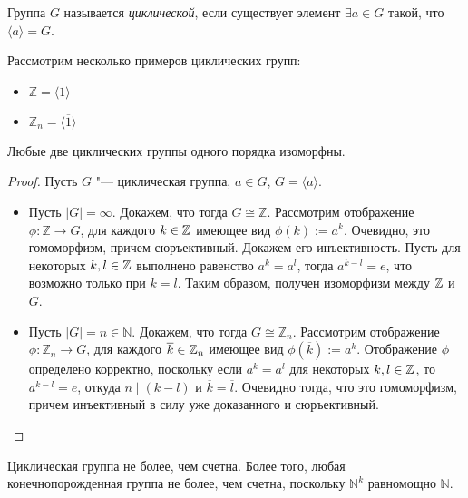 \begin{definition}
	Группа $G$ называется \textit{циклической}, если существует элемент $\exists a \in G$ такой, что $\langle a\rangle = G$.
\end{definition}

\begin{example}
	Рассмотрим несколько примеров циклических групп:
	\begin{itemize}
		\item $\mathbb{Z} = \langle 1 \rangle$
		\item $\mathbb{Z}_n = \langle \overline{1} \rangle$
	\end{itemize}
\end{example}

\begin{theorem}
	Любые две циклических группы одного порядка изоморфны.
\end{theorem}

\begin{proof}
	Пусть $G$ "--- циклическая группа, $a \in G$, $G = \langle a\rangle$.
	
	\begin{itemize}
		\item Пусть $|G| = \infty$. Докажем, что тогда $G \cong \mathbb{Z}$. Рассмотрим отображение $\phi: \mathbb{Z} \rightarrow G$, для каждого $k \in \mathbb{Z}$ имеющее вид $\phi(k) := a^k$. Очевидно, это гомоморфизм, причем сюръективный. Докажем его инъективность. Пусть для некоторых $k, l \in \mathbb{Z}$ выполнено равенство $a^k = a^l$, тогда $a^{k - l} = e$, что возможно только при $k = l$. Таким образом, получен изоморфизм между $\mathbb{Z}$ и $G$.
		
		\item Пусть $|G| = n \in \mathbb{N}$. Докажем, что тогда $G \cong \mathbb{Z}_n$. Рассмотрим отображение $\phi: \mathbb{Z}_n \rightarrow G$, для каждого $\overline{k} \in \mathbb{Z}_n$ имеющее вид $\phi(\overline{k}) := a^k$. Отображение $\phi$ определено корректно, поскольку если $a^k = a^l$ для некоторых $k, l \in \mathbb{Z}$, то $a^{k - l} = e$, откуда $n \mid (k - l)$ и $\overline{k} = \overline{l}$. Очевидно тогда, что это гомоморфизм, причем инъективный в силу уже доказанного и сюръективный.\qedhere
	\end{itemize}
\end{proof}

\begin{note}
	Циклическая группа не более, чем счетна. Более того, любая конечнопорожденная группа не более, чем счетна, поскольку $\mathbb{N}^k$ равномощно $\mathbb{N}$.
\end{note}

